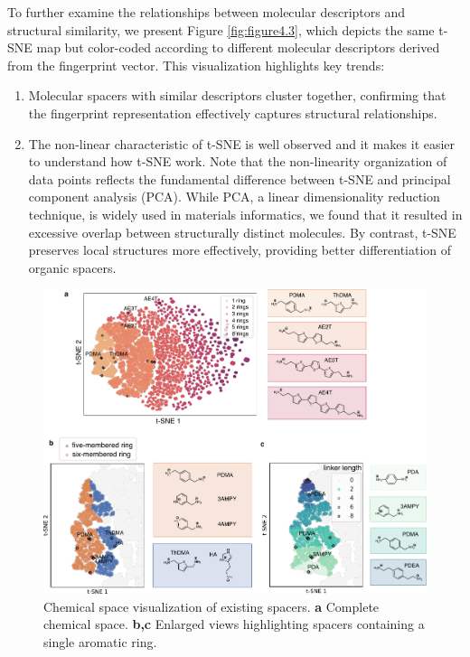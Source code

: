 To further examine the relationships between molecular descriptors and structural similarity, we present Figure \ref{fig:figure4.3}, which depicts the same t-SNE map but color-coded according to different molecular descriptors derived from the fingerprint vector. 
This visualization highlights key trends:
\begin{enumerate}
    \item Molecular spacers with similar descriptors cluster together, confirming that the fingerprint representation effectively captures structural relationships.
    \item The non-linear characteristic of t-SNE is well observed and it makes it easier to understand how t-SNE work. Note that the non-linearity organization of data points reflects the fundamental difference between t-SNE and principal component analysis (PCA). While PCA, a linear dimensionality reduction technique, is widely used in materials informatics, we found that it resulted in excessive overlap between structurally distinct molecules. By contrast, t-SNE preserves local structures more effectively, providing better differentiation of organic spacers.
\end{enumerate}

\begin{figure}[htbp]
    \centering
    \includegraphics[width=\textwidth]{figures/HT-ML/figure4-4.pdf}
    \caption[Chemical space visualization of existing spacers.]{Chemical space visualization of existing spacers. \textbf{a} Complete chemical space. \textbf{b,c} Enlarged views highlighting spacers containing a single aromatic ring.}
    \label{fig:figure4.4}
\end{figure}


